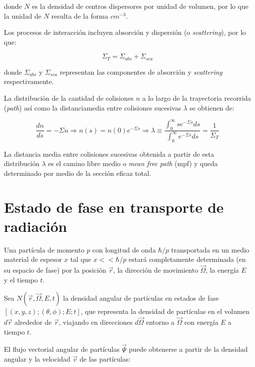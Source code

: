\noindent
donde $N$ es la densidad de centros dispersores por unidad de volumen, por lo que la unidad de $N$ resulta de la forma $cm^{-3}$.

Los procesos de interacción incluyen absorción y dispersión (o \emph{scattering}), por lo que:

\begin{equation}
 \Sigma_T = \Sigma_{abs} + \Sigma_{sca}
\end{equation}

\noindent
donde $\Sigma_{abs}$ y $\Sigma_{sca}$ representan las componentes de absorción y \emph{scattering} respectivamente.

La distribución de la cantidad de colisiones $n$ a lo largo de la trayectoria recorrida (\emph{path}) así como la distanciamedia entre colisiones sucesivas $\lambda$ se obtienen de:

\begin{equation}
 \frac{dn}{ds} = -\Sigma n \Rightarrow n(s) = n(0) e^{-\Sigma s} \Rightarrow \lambda \equiv \frac{\int_{0}^{\infty} s e^{-\Sigma s} ds}{\int_{0}^{\infty} e^{-\Sigma s} ds} = \frac{1}{\Sigma_T}
 \label{dn}
\end{equation}

La distancia media entre colisiones sucesivas obtenida a partir de esta distribución $\lambda$ es el camino libre medio o \emph{mean free path} (mpf) y queda determinado por medio de la sección eficaz total.

\section{Estado de fase en transporte de radiaci\'on}

Una partícula de momento $p$ con longitud de onda $\hbar/p$ transportada en un medio material de espesor $x$ tal que $x << \hbar/p$ estará completamente determinada (en su espacio de fase) por la posición $\vec{r}$, la dirección de movimiento $\vec{\Omega}$, la energía $E$ y el tiempo $t$.

Sea $N(\vec{r}, \vec{\Omega}, E, t)$ la densidad angular de partículas en estados de fase $[(x, y, z); (\theta, \phi); E;t]$, que representa la densidad de partículas en el volumen $d\vec{r}$ alrededor de $\vec{r}$, viajando en direcciones $d\vec{\Omega}$ entorno a $\vec{\Omega}$ con energía $E$ a tiempo $t$.

El flujo vectorial angular de partículas $\vec{\Psi}$ puede obtenerse a partir de la densidad angular y la velocidad $\vec{v}$ de las partículas:


